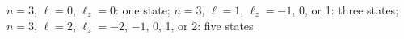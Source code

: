 $n=3$, $\ell=0$, $\ell_z=0$: one state;
$n=3$, $\ell=1$, $\ell_z=-1$, 0, or 1: three states;
$n=3$, $\ell=2$, $\ell_z=-2$, $-1$, 0, 1, or 2: five states
